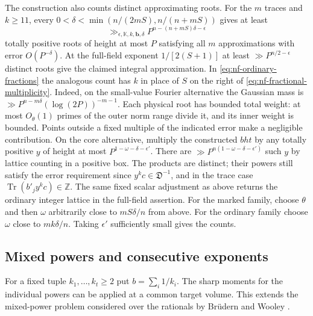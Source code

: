 \documentclass[11pt,letterpaper]{article}
\theoremstyle{definition}
\numberwithin{equation}{section}
\begin{document}
The construction also counts distinct approximating roots. For the
$m$ traces and $k\ge11$, every
$0<\delta<\min(n/(2mS),n/(n+mS))$ gives at least
\begin{equation}\label{eq:nf-fractional-multiplicity}
                \gg_{\epsilon,\mathbb K,k,\mathbf b,\delta}
                           P^{n-(n+mS)\delta-\epsilon}
\end{equation}
totally positive roots of height at most $P$ satisfying all $m$
approximations with error $O(P^{-\delta})$. At the full-field
exponent $1/[2(S+1)]$ at least $\gg P^{n/2-\epsilon}$ distinct
roots give the claimed integral approximation.
In \eqref{eq:nf-ordinary-fractions} the analogous count has $k$
in place of $S$ on the right of \eqref{eq:nf-fractional-multiplicity}.
Indeed, on the small-value Fourier alternative the Gaussian mass is
$\gg P^{n-m\delta}(\log(2P))^{-m-1}$. Each physical root has bounded
total weight: at most $O_{\theta}(1)$ primes of the outer norm range
divide it, and its inner weight is bounded. Points outside a fixed
multiple of the indicated error make a negligible contribution.
On the core alternative, multiply the constructed $bht$ by any
totally positive $y$ of height at most $P^{1-\omega-\delta-\epsilon'}$.
There are $\gg P^{n(1-\omega-\delta-\epsilon')}$ such $y$ by lattice
counting in a positive box. The products are distinct; their powers
still satisfy the error requirement since $y^k c\in\mathfrak D^{-1}$,
and in the trace case $\operatorname{Tr}(b'_j y^k c)\in\mathbb Z$.
The same fixed scalar adjustment as above returns the ordinary
integer lattice in the full-field assertion. For the marked family,
choose $\theta$ and then $\omega$ arbitrarily close to $mS\delta/n$
from above. For the ordinary family choose $\omega$ close to
$mk\delta/n$. Taking $\epsilon'$ sufficiently small gives the counts.

\subsection{Mixed powers and consecutive exponents}
\label{sec:nf-mixed}
For a fixed tuple $k_1,\ldots,k_t\ge2$ put $b=\sum_i1/k_i$.
The sharp moments for the individual powers can be applied at a
common target volume. This extends the mixed-power problem considered
over the rationals by Br\"udern and Wooley \cite{NFMixedBW}.
\end{document}
